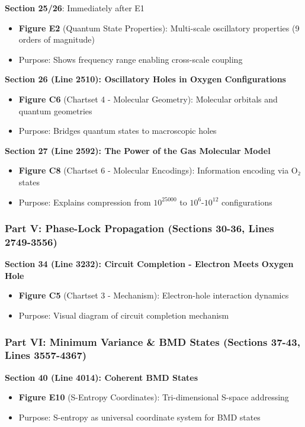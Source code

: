 \documentclass[11pt]{article}
\begin{document}
\textbf{Section 25/26}: Immediately after E1
\begin{itemize}
\item \textbf{Figure E2} (Quantum State Properties): Multi-scale oscillatory properties (9 orders of magnitude)
\item Purpose: Shows frequency range enabling cross-scale coupling
\end{itemize}

\textbf{Section 26 (Line 2510): Oscillatory Holes in Oxygen Configurations}
\begin{itemize}
\item \textbf{Figure C6} (Chartset 4 - Molecular Geometry): Molecular orbitals and quantum geometries
\item Purpose: Bridges quantum states to macroscopic holes
\end{itemize}

\textbf{Section 27 (Line 2592): The Power of the Gas Molecular Model}
\begin{itemize}
\item \textbf{Figure C8} (Chartset 6 - Molecular Encodings): Information encoding via O₂ states
\item Purpose: Explains compression from $10^{25000}$ to $10^6$-$10^{12}$ configurations
\end{itemize}

\subsubsection{Part V: Phase-Lock Propagation (Sections 30-36, Lines 2749-3556)}

\textbf{Section 34 (Line 3232): Circuit Completion - Electron Meets Oxygen Hole}
\begin{itemize}
\item \textbf{Figure C5} (Chartset 3 - Mechanism): Electron-hole interaction dynamics
\item Purpose: Visual diagram of circuit completion mechanism
\end{itemize}

\subsubsection{Part VI: Minimum Variance \& BMD States (Sections 37-43, Lines 3557-4367)}

\textbf{Section 40 (Line 4014): Coherent BMD States}
\begin{itemize}
\item \textbf{Figure E10} (S-Entropy Coordinates): Tri-dimensional S-space addressing
\item Purpose: S-entropy as universal coordinate system for BMD states
\end{itemize}
\end{document}
